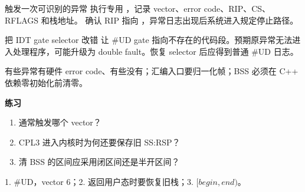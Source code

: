 
\begin{experimentbox}{触发一次可识别的异常}
执行专用 ，记录 vector、error code、RIP、CS、RFLAGS 和栈地址。
确认 RIP 指向 ，异常日志出现后系统进入规定停止路径。
\end{experimentbox}

\begin{faultinjectionbox}{把 IDT gate selector 改错}
让 \#UD gate 指向不存在的代码段。预期原异常无法进入处理程序，可能升级为
double fault。恢复 selector 后应得到普通 \#UD 日志。
\end{faultinjectionbox}

\begin{pitfallbox}
有些异常有硬件 error code、有些没有；汇编入口要归一化帧；BSS 必须在 C++
依赖零初始化前清零。
\end{pitfallbox}

\textbf{练习}
\begin{enumerate}[leftmargin=2.2em]
  \item {} 通常触发哪个 vector？
  \item CPL3 进入内核时为何还要保存旧 SS:RSP？
  \item 清 BSS 的区间应采用闭区间还是半开区间？
\end{enumerate}
\begin{answerbox}
1. \#UD，vector 6；2. 返回用户态时要恢复旧栈；3. \([begin,end)\)。
\end{answerbox}
